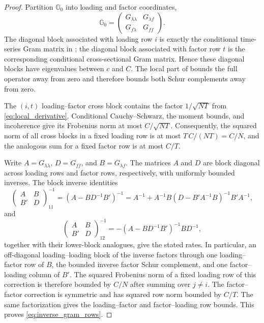 \documentclass[11pt]{article}
\numberwithin{equation}{section}
\theoremstyle{remark}
\begin{document}
\begin{proof}
Partition $\mathbb G_0$ into loading and factor coordinates,
$$
\mathbb G_0
=
\begin{pmatrix}
G_{\lambda\lambda}&G_{\lambda f}\\
G_{f\lambda}&G_{ff}
\end{pmatrix}.
$$
The diagonal block associated with loading row $i$ is exactly the conditional time-series Gram matrix in ; the diagonal block associated with factor row $t$ is the corresponding conditional cross-sectional Gram matrix. Hence these diagonal blocks have eigenvalues between $c$ and $C$. The local part of  bounds the full operator away from zero and therefore bounds both Schur complements away from zero.

The $(i,t)$ loading--factor cross block contains the factor $1/\sqrt{NT}$ from \eqref{eq:local_derivative}. Conditional Cauchy--Schwarz, the moment bounds, and incoherence give its Frobenius norm at most $C/\sqrt{NT}$. Consequently, the squared norm of all cross blocks in a fixed loading row is at most $T\,C/(NT)=C/N$, and the analogous sum for a fixed factor row is at most $C/T$.

Write $A=G_{\lambda\lambda}$, $D=G_{ff}$, and $B=G_{\lambda f}$. The matrices $A$ and $D$ are block diagonal across loading rows and factor rows, respectively, with uniformly bounded inverses. The block inverse identities
$$
\begin{pmatrix}A&B\\B'&D\end{pmatrix}^{-1}_{11}
=(A-BD^{-1}B')^{-1}
=
A^{-1}
+
A^{-1}B(D-B'A^{-1}B)^{-1}B'A^{-1},
$$
and
$$
\begin{pmatrix}A&B\\B'&D\end{pmatrix}^{-1}_{12}
=-(A-BD^{-1}B')^{-1}BD^{-1},
$$
together with their lower-block analogues, give the stated rates. In particular, an off-diagonal loading--loading block of the inverse factors through one loading--factor row of $B$, the bounded inverse factor Schur complement, and one factor--loading column of $B'$. The squared Frobenius norm of a fixed loading row of this correction is therefore bounded by $C/N$ after summing over $j\ne i$. The factor--factor correction is symmetric and has squared row norm bounded by $C/T$. The same factorization gives the loading--factor and factor--loading row bounds. This proves \eqref{eq:inverse_gram_rows}.
\end{proof}
\end{document}
